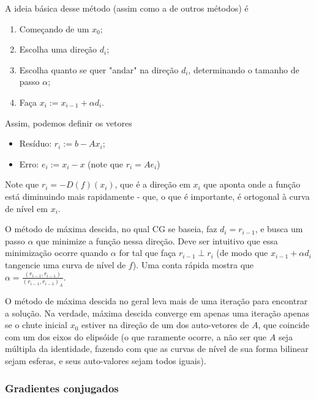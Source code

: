 \documentclass[11pt]{article}
\providecommand{\tightlist}{%
      \setlength{\itemsep}{0pt}\setlength{\parskip}{0pt}}
\begin{document}
    A ideia básica desse método (assim como a de outros métodos) é

\begin{enumerate}
\def\labelenumi{\arabic{enumi}.}
\tightlist
\item
  Começando de um \(x_0\);
\item
  Escolha uma direção \(d_i\);
\item
  Escolha quanto se quer "andar" na direção \(d_i\), determinando o
  tamanho de passo \(\alpha\);
\item
  Faça \(x_i := x_{i-1} + \alpha d_i\).
\end{enumerate}

Assim, podemos definir os vetores

\begin{itemize}
\tightlist
\item
  Resíduo: \(r_i := b - Ax_i\);
\item
  Erro: \(e_i := x_i - x\) (note que \(r_i = Ae_i\))
\end{itemize}

Note que \(r_i = - D(f)(x_i)\), que é a direção em \(x_i\) que aponta
onde a função está diminuindo mais rapidamente - que, o que é
importante, é ortogonal à curva de nível em \(x_i\).

O método de máxima descida, no qual CG se baseia, faz \(d_i = r_{i-1}\),
e busca um passo \(\alpha\) que minimize a função nessa direção. Deve
ser intuitivo que essa minimização ocorre quando \(\alpha\) for tal que
faça \(r_{i-1} \perp r_i\) (de modo que \(x_{i-1} + \alpha d_i\)
tangencie uma curva de nível de \(f\)). Uma conta rápida mostra que
\(\alpha = \frac{(r_{i-1},r_{i-1})}{(r_{i-1},r_{i-1})_A}\).

    O método de máxima descida no geral leva mais de uma iteração para
encontrar a solução. Na verdade, máxima descida converge em apenas uma
iteração apenas se o chute inicial \(x_0\) estiver na direção de um dos
auto-vetores de \(A\), que coincide com um dos eixos do elipsóide (o que
raramente ocorre, a não ser que \(A\) seja múltipla da identidade,
fazendo com que as curvas de nível de sua forma bilinear sejam esferas,
e seus auto-valores sejam todos iguais).

    

    \subsubsection{Gradientes conjugados}\label{gradientes-conjugados}
\end{document}
